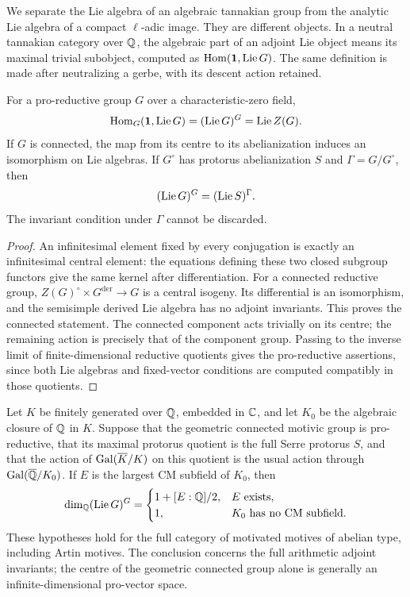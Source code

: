 We separate the Lie algebra of an algebraic tannakian group from the analytic Lie algebra of a compact $\ell$-adic image. They are different objects. In a neutral tannakian category over $\mathbb Q$, the algebraic part of an adjoint Lie object means its maximal trivial subobject, computed as $\operatorname{Hom}(\mathbf1,\operatorname{Lie} G)$. The same definition is made after neutralizing a gerbe, with its descent action retained.

\begin{proposition}
\label{c:lie-centre}
For a pro-reductive group $G$ over a characteristic-zero field,
\[
 \operatorname{Hom}_G(\mathbf1,\operatorname{Lie} G)=(\operatorname{Lie} G)^G=\operatorname{Lie} Z(G).
\]
If $G$ is connected, the map from its centre to its abelianization induces an isomorphism on Lie algebras. If $G^\circ$ has protorus abelianization $S$ and $\Gamma=G/G^\circ$, then
\[
 (\operatorname{Lie} G)^G=(\operatorname{Lie} S)^\Gamma.
\]
The invariant condition under $\Gamma$ cannot be discarded.
\end{proposition}

\begin{proof}
An infinitesimal element fixed by every conjugation is exactly an infinitesimal central element: the equations defining these two closed subgroup functors give the same kernel after differentiation. For a connected reductive group, $Z(G)^\circ\times G^{\mathrm{der}}\to G$ is a central isogeny. Its differential is an isomorphism, and the semisimple derived Lie algebra has no adjoint invariants. This proves the connected statement. The connected component acts trivially on its centre; the remaining action is precisely that of the component group. Passing to the inverse limit of finite-dimensional reductive quotients gives the pro-reductive assertions, since both Lie algebras and fixed-vector conditions are computed compatibly in those quotients.
\end{proof}

\begin{theorem}
\label{c:serre-centre}
Let $K$ be finitely generated over $\mathbb Q$, embedded in $\mathbb C$, and let $K_0$ be the algebraic closure of $\mathbb Q$ in $K$. Suppose that the geometric connected motivic group is pro-reductive, that its maximal protorus quotient is the full Serre protorus $S$, and that the action of $\operatorname{Gal}(\overline K/K)$ on this quotient is the usual action through $\operatorname{Gal}(\overline{\mathbb Q}/K_0)$. If $E$ is the largest CM subfield of $K_0$, then
\[
 \dim_\mathbb Q (\operatorname{Lie} G)^G=
 \begin{cases}1+[E:\mathbb Q]/2,&E\text{ exists},\\1,&K_0\text{ has no CM subfield}.
 \end{cases}
\]
These hypotheses hold for the full category of motivated motives of abelian type, including Artin motives. The conclusion concerns the full arithmetic adjoint invariants; the centre of the geometric connected group alone is generally an infinite-dimensional pro-vector space.
\end{theorem}

